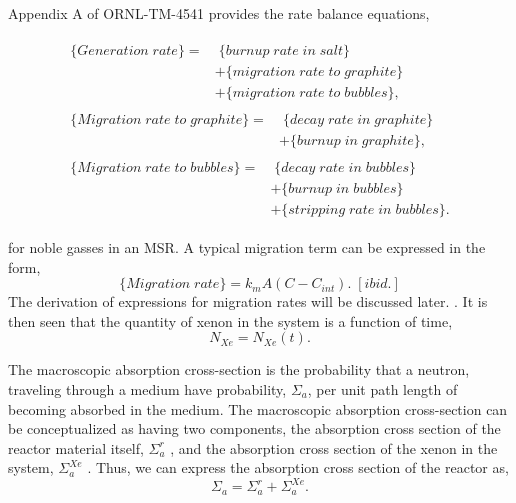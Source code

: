 Appendix A of ORNL-TM-4541 provides the rate balance equations,



\begin{subequations}
\begin{align}
 \begin{split}
    \{Generation\;rate\} =&\;\{burnup\;rate\;in\;salt\} \\
    & +  \{migration\;rate\;to\;graphite\} \\ &+\{migration\;rate\;to\;bubbles\} ,
  \end{split} \\ 
  \begin{split}
   \{Migration\;rate\;to\;graphite\} = &\;\{decay\;rate\;in\;graphite\}  \\
    & + \{burnup\;in\;graphite\} ,
  \end{split} \\
    \begin{split}
   \{Migration\;rate\;to\;bubbles\} = &\;\{decay\;rate\;in\;bubbles\}  \\
    & + \{burnup\;in\;bubbles\} \\
    & +  \{stripping\;rate\;in\;bubbles\}.
  \end{split}
\end{align}
\end{subequations}

for noble gasses in an MSR. \cite[p. 170]{Robertson1971}  A typical migration term can be expressed in the form,
\begin{equation}
    \{Migration\;rate\} = k_m A (C - C_{int}).\;[ibid.] 
    \label{eqn_migration}
\end{equation}
The derivation of expressions for migration rates will be discussed later. .  It is then seen that the quantity of xenon in the system is a function of time,
\begin{equation}
    N_{Xe} = N_{Xe}(t).
\end{equation}

The macroscopic absorption cross-section is the probability that a neutron, traveling through a medium have probability, $\Sigma_a$, per unit path length of becoming absorbed in the medium.  The macroscopic absorption cross-section can be conceptualized as having two components, the absorption cross section of the reactor material itself, $\Sigma_a^r$ , and the absorption cross section of the xenon in the system, $\Sigma_a^{Xe}$ .  Thus, we can express the absorption cross section of the reactor as,
\begin{equation}
\Sigma_a = \Sigma_a^{r} + \Sigma_a^{Xe}.
\end{equation}

